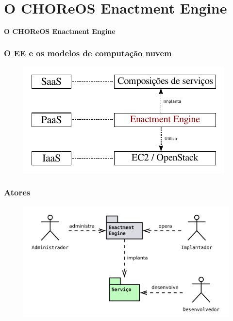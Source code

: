\documentclass{beamer}
\newcommand\sectiontitle[1]{\begin{center}\huge\textbf{#1}\end{center}}
\begin{document}

\section{O CHOReOS Enactment Engine}

\begin{frame}

\sectiontitle{O CHOReOS Enactment Engine}

\end{frame}


\begin{frame}
\frametitle{O EE e os modelos de computação nuvem}

\begin{figure}
\includegraphics[width=1\linewidth]{img/nuvem_modelos}
\end{figure}

\end{frame}


\begin{frame}
\frametitle{Atores}

\begin{figure}
\includegraphics[width=0.8\linewidth]{img/atores}
\end{figure}

\end{frame}
\end{document}

